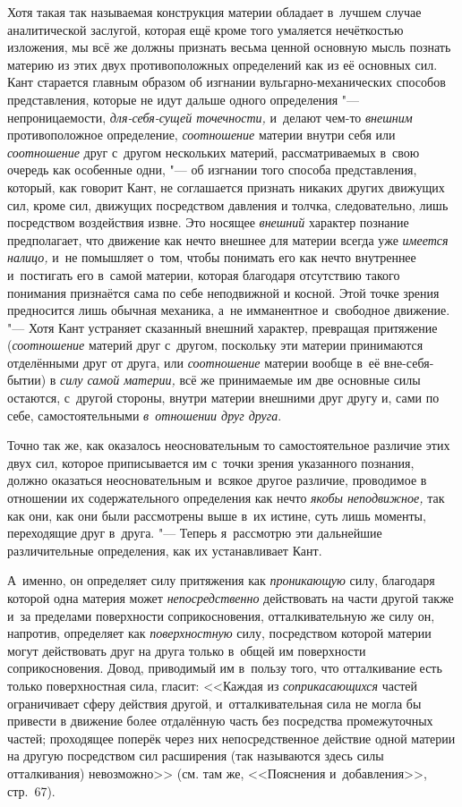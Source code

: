 Хотя такая так называемая конструкция материи обладает в~лучшем случае
аналитической заслугой, которая ещё кроме того умаляется нечёткостью
изложения, мы всё же должны признать весьма ценной основную мысль познать
материю из этих двух противоположных определений как из её основных сил.
Кант старается главным образом об изгнании вульгарно-механических способов
представления, которые не идут дальше одного определения "---
непроницаемости, {\em для-себя-сущей точечности,} и~делают чем-то
{\em внешним} противоположное определение,
{\em соотношение} материи внутри себя или
{\em соотношение} друг с~другом нескольких материй,
рассматриваемых в~свою очередь как особенные одни, "--- об изгнании того
способа представления, который, как говорит Кант, не соглашается признать
никаких других движущих сил, кроме сил, движущих посредством давления и
толчка, следовательно, лишь посредством воздействия извне. Это носящее
{\em внешний} характер познание предполагает, что
движение как нечто внешнее для материи всегда уже
{\em имеется налицо,} и~не помышляет о~том, чтобы
понимать его как нечто внутреннее и~постигать его в~самой материи, которая
благодаря отсутствию такого понимания признаётся сама по себе неподвижной и
косной. Этой точке зрения предносится лишь обычная механика, а~не
имманентное и~свободное движение. "--- Хотя Кант устраняет сказанный внешний
характер, превращая притяжение ({\em соотношение}
материй друг с~другом, поскольку эти материи принимаются отделёнными друг
от друга, или {\em соотношение} материи вообще в~её
вне-себя-бытии) в {\em силу самой материи,} всё же
принимаемые им две основные силы остаются, с~другой стороны, внутри материи
внешними друг другу и, сами по себе, самостоятельными
{\em в~отношении друг друга}.

Точно так же, как оказалось неосновательным то самостоятельное различие этих
двух сил, которое приписывается им с~точки зрения указанного познания,
должно оказаться неосновательным и~всякое другое различие, проводимое в
отношении их содержательного определения как нечто
{\em якобы неподвижное,} так как они, как они были
рассмотрены выше в~их истине, суть лишь моменты, переходящие друг в~друга.
"--- Теперь я~рассмотрю эти дальнейшие различительные определения, как их
устанавливает Кант.

А~именно, он определяет силу притяжения как
{\em проникающую} силу, благодаря которой одна материя
может {\em непосредственно} действовать на части другой
также и~за пределами поверхности соприкосновения, отталкивательную же силу
он, напротив, определяет как {\em поверхностную} силу,
посредством которой материи могут действовать друг на друга только в~общей
им поверхности соприкосновения. Довод, приводимый им в~пользу того, что
отталкивание есть только поверхностная сила, гласит:
<<Каждая из {\em соприкасающихся} частей ограничивает
сферу действия другой, и~отталкивательная сила не могла бы привести в
движение более отдалённую часть без посредства промежуточных частей;
проходящее поперёк через них непосредственное действие одной материи на
другую посредством сил расширения (так называются здесь силы отталкивания)
невозможно>> (см. там же, <<Пояснения и~добавления>>, стр.~67).

